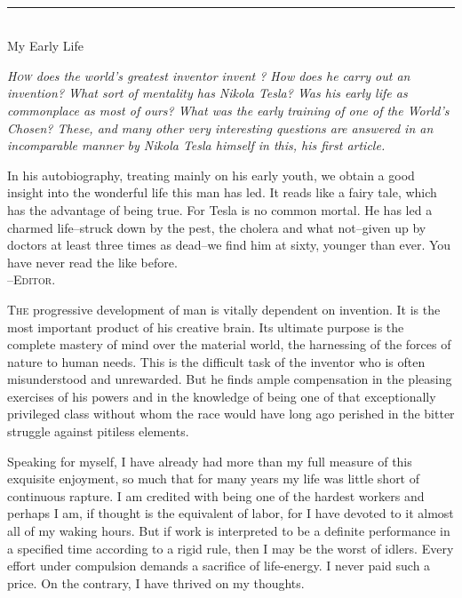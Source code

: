 \documentclass[a4paper,12pt,english,twoside,openright]{memoir}
\begin{document}
	\thispagestyle{empty}
	\markright{}
	\vspace*{5em}
	\begin{center}
		\bfseries
		\\
		\noindent\rule{.5\linewidth}{1pt}\\
		\medskip
		{\noindent\LARGE My Early Life}
		
		\bigskip
		
		{\normalfont\smallskip\small\protect\parbox{.75\linewidth}{\itshape
				\lettrine[lines=2]{H}{ow} does the world's greatest inventor invent ? How does he carry out an invention? What sort of mentality has Nikola Tesla? Was his early life as commonplace as most of ours? What was the early training of one of the World's Chosen? These, and many other very interesting questions are answered in an incomparable manner by Nikola Tesla himself in this, his first article.
				
				In his autobiography, treating mainly on his early youth, we obtain a good insight into the wonderful life this man has led. It reads like a fairy tale, which has the advantage of being true. For Tesla is no common mortal. He has led a charmed life--struck down by the pest, the cholera and what not--given up by doctors at least three times as dead--we find him at sixty, younger than ever. You have never read the like before.\\
				
				\hfill --\scshape{Editor}.
			}
			\par
		}
		\vspace*{5em}

	\end{center}
	
	
	\lettrine[lines=3]{T}{he} progressive development of man is vitally dependent on invention.  It is the most important 
	product of his creative brain.  Its ultimate purpose is the complete mastery of mind over the 
	material world, the harnessing of the forces of nature to human needs.  This is the difficult task of 
	the inventor who is often misunderstood and unrewarded.  But he finds ample compensation in 
	the pleasing exercises of his powers and in the knowledge of being one of that exceptionally 
	privileged class without whom the race would have long ago perished in the bitter struggle 
	against pitiless elements.  
	
	Speaking for myself, I have already had more than my full measure of this exquisite enjoyment, 
	so much that for many years my life was little short of continuous rapture.  I am credited with 
	being one of the hardest workers and perhaps I am, if thought is the equivalent of labor, for I have 
	devoted to it almost all of my waking hours.  But if work is interpreted to be a definite performance 
	in a specified time according to a rigid rule, then I may be the worst of idlers.  Every effort under 
	compulsion demands a sacrifice of life-energy.  I never paid such a price.  On the contrary, I have 
	thrived on my thoughts.  
	
\end{document}
